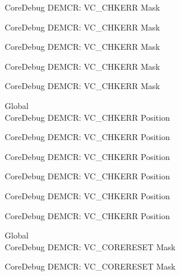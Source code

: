 \begin{DoxyRefList}
\label{deprecated__deprecated000208}%
%
Core\+Debug DEMCR\+: VC\+\_\+\+CHKERR Mask 

\label{deprecated__deprecated000350}%
%
Core\+Debug DEMCR\+: VC\+\_\+\+CHKERR Mask 

\label{deprecated__deprecated000426}%
%
Core\+Debug DEMCR\+: VC\+\_\+\+CHKERR Mask 

\label{deprecated__deprecated000515}%
%
Core\+Debug DEMCR\+: VC\+\_\+\+CHKERR Mask 

\label{deprecated__deprecated000617}%
%
Core\+Debug DEMCR\+: VC\+\_\+\+CHKERR Mask  
\item[Global \doxylink{group___c_m_s_i_s___core_debug_ga10fc7c53bca904c128bc8e1a03072d50}{Core\+Debug\+\_\+\+DEMCR\+\_\+\+VC\+\_\+\+CHKERR\+\_\+\+Pos} ]\hfill \\
\label{deprecated__deprecated000063}%
%
Core\+Debug DEMCR\+: VC\+\_\+\+CHKERR Position 

\label{deprecated__deprecated000207}%
%
Core\+Debug DEMCR\+: VC\+\_\+\+CHKERR Position 

\label{deprecated__deprecated000349}%
%
Core\+Debug DEMCR\+: VC\+\_\+\+CHKERR Position 

\label{deprecated__deprecated000425}%
%
Core\+Debug DEMCR\+: VC\+\_\+\+CHKERR Position 

\label{deprecated__deprecated000514}%
%
Core\+Debug DEMCR\+: VC\+\_\+\+CHKERR Position 

\label{deprecated__deprecated000616}%
%
Core\+Debug DEMCR\+: VC\+\_\+\+CHKERR Position  
\item[Global \doxylink{group___c_m_s_i_s___core_debug_ga906476e53c1e1487c30f3a1181df9e30}{Core\+Debug\+\_\+\+DEMCR\+\_\+\+VC\+\_\+\+CORERESET\+\_\+\+Msk} ]\hfill \\
\label{deprecated__deprecated000070}%
%
Core\+Debug DEMCR\+: VC\+\_\+\+CORERESET Mask 

\label{deprecated__deprecated000138}%
%
Core\+Debug DEMCR\+: VC\+\_\+\+CORERESET Mask 


\end{DoxyRefList}
